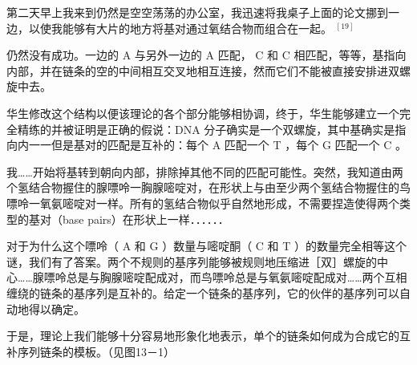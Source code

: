 第二天早上我来到仍然是空空荡荡的办公室，我迅速将我桌子上面的论文挪到一边，以使我能够有大片的地方将基对通过氧结合物而组合在一起。 ${ }^{[19]}$

仍然没有成功。一边的 A 与另外一边的 A 匹配， C 和 C 相匹配，等等，基指向内部，并在链条的空的中间相互交叉地相互连接，然而它们不能被直接安排进双螺旋中去。

华生修改这个结构以便该理论的各个部分能够相协调，终于，华生能够建立一个完全精练的并被证明是正确的假说：DNA 分子确实是一个双螺旋，其中基确实是指向内一一但是基对的匹配是互补的：每个 A 匹配一个 T ，每个 G 匹配一个 C 。

我……开始将基转到朝向内部，排除掉其他不同的匹配可能性。突然，我知道由两个氢结合物握住的腺嘌呤一胸腺嘧啶对，在形状上与由至少两个氢结合物握住的鸟嘌呤一氧氨嘧啶对一样。所有的氢结合物似乎自然地形成，不需要捏造使得两个类型的基对（base pairs）在形状上一样．．．．．．

对于为什么这个嘌呤（ A 和 G ）数量与嘧啶酮（ C 和 T ）的数量完全相等这个谜，我们有了答案。两个不规则的基序列能够被规则地压缩进［双］螺旋的中心……腺嘌呤总是与胸腺嘧啶配成对，而鸟嘌呤总是与氧氨嘧啶配成对……两个互相缠绕的链条的基序列是互补的。给定一个链条的基序列，它的伙伴的基序列可以自动地得以确定。

于是，理论上我们能够十分容易地形象化地表示，单个的链条如何成为合成它的互补序列链条的模板。\cite{watson1968e}（见图13－1）

